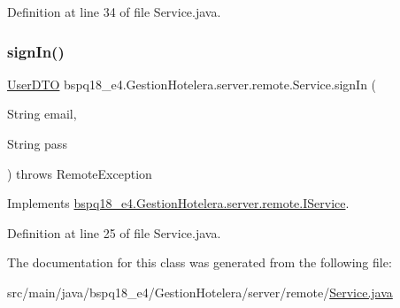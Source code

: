 Definition at line 34 of file Service.\+java.

\mbox{\label{classbspq18__e4_1_1_gestion_hotelera_1_1server_1_1remote_1_1_service_ada202b6aa741a41984d4da00c169b22e}} 
\subsubsection{\texorpdfstring{sign\+In()}{signIn()}}
{\footnotesize\ttfamily \mbox{\hyperlink{classbspq18__e4_1_1_gestion_hotelera_1_1server_1_1dto_1_1_user_d_t_o}{User\+D\+TO}} bspq18\+\_\+e4.\+Gestion\+Hotelera.\+server.\+remote.\+Service.\+sign\+In (\begin{DoxyParamCaption}\item[{String}]{email,  }\item[{String}]{pass }\end{DoxyParamCaption}) throws Remote\+Exception}



Implements \mbox{\hyperlink{interfacebspq18__e4_1_1_gestion_hotelera_1_1server_1_1remote_1_1_i_service_a8bf5c73858016c112f2c93792f61eec5}{bspq18\+\_\+e4.\+Gestion\+Hotelera.\+server.\+remote.\+I\+Service}}.



Definition at line 25 of file Service.\+java.



The documentation for this class was generated from the following file\+:\begin{DoxyCompactItemize}
\item 
src/main/java/bspq18\+\_\+e4/\+Gestion\+Hotelera/server/remote/\mbox{\hyperlink{_service_8java}{Service.\+java}}\end{DoxyCompactItemize}
